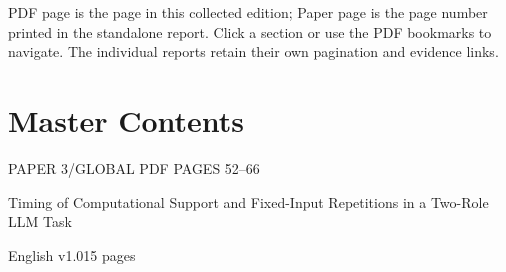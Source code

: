 \documentclass[10pt,a4paper]{article}
\renewcommand{\arraystretch}{1.15}
\begin{document}
\vfill{\small PDF page is the page in this collected edition; Paper page is the page number printed in the standalone report. Click a section or use the PDF bookmarks to navigate. The individual reports retain their own pagination and evidence links.\par}
\clearpage\section{Master Contents}\label{contents-3}
{\sffamily\color{teal}\small PAPER 3\quad/\quad GLOBAL PDF PAGES 52--66\par}
{\sffamily\fontsize{11}{15}\selectfont Timing of Computational Support and Fixed-Input Repetitions in a Two-Role LLM Task\par}
\medskip English v1.0\hfill 15 pages\par\medskip
\begingroup\fontsize{9.5}{12.5}\selectfont\renewcommand{\arraystretch}{1.18}
\end{document}
